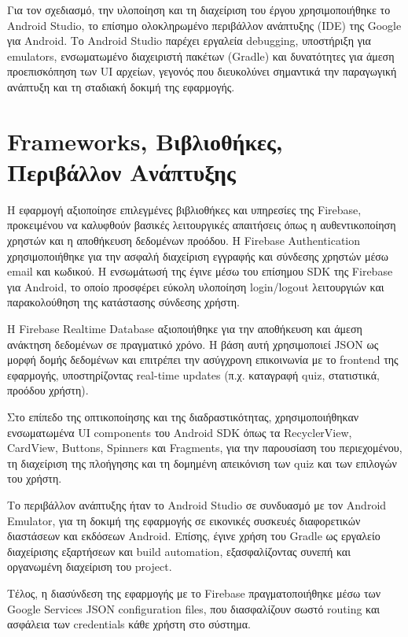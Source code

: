 \documentclass[11pt]{report}
\begin{document}
Για τον σχεδιασμό, την υλοποίηση και τη διαχείριση του έργου χρησιμοποιήθηκε το Android Studio, το επίσημο ολοκληρωμένο περιβάλλον ανάπτυξης (IDE) της Google για Android. Το Android Studio παρέχει εργαλεία debugging, υποστήριξη για emulators, ενσωματωμένο διαχειριστή πακέτων (Gradle) και δυνατότητες για άμεση προεπισκόπηση των UI αρχείων, γεγονός που διευκολύνει σημαντικά την παραγωγική ανάπτυξη και τη σταδιακή δοκιμή της εφαρμογής. 

\section{Frameworks, Βιβλιοθήκες, Περιβάλλον Ανάπτυξης}

Η εφαρμογή αξιοποίησε επιλεγμένες βιβλιοθήκες και υπηρεσίες της Firebase, προκειμένου να καλυφθούν βασικές λειτουργικές απαιτήσεις όπως η αυθεντικοποίηση χρηστών και η αποθήκευση δεδομένων προόδου. Η Firebase Authentication χρησιμοποιήθηκε για την ασφαλή διαχείριση εγγραφής και σύνδεσης χρηστών μέσω email και κωδικού. Η ενσωμάτωσή της έγινε μέσω του επίσημου SDK της Firebase για Android, το οποίο προσφέρει εύκολη υλοποίηση login/logout λειτουργιών και παρακολούθηση της κατάστασης σύνδεσης χρήστη. 

Η Firebase Realtime Database αξιοποιήθηκε για την αποθήκευση και άμεση ανάκτηση δεδομένων σε πραγματικό χρόνο. Η βάση αυτή χρησιμοποιεί JSON ως μορφή δομής δεδομένων και επιτρέπει την ασύγχρονη επικοινωνία με το frontend της εφαρμογής, υποστηρίζοντας real-time updates (π.χ. καταγραφή quiz, στατιστικά, προόδου χρήστη). 

Στο επίπεδο της οπτικοποίησης και της διαδραστικότητας, χρησιμοποιήθηκαν ενσωματωμένα UI components του Android SDK όπως τα RecyclerView, CardView, Buttons, Spinners και Fragments, για την παρουσίαση του περιεχομένου, τη διαχείριση της πλοήγησης και τη δομημένη απεικόνιση των quiz και των επιλογών του χρήστη. 

Το περιβάλλον ανάπτυξης ήταν το Android Studio σε συνδυασμό με τον Android Emulator, για τη δοκιμή της εφαρμογής σε εικονικές συσκευές διαφορετικών διαστάσεων και εκδόσεων Android. Επίσης, έγινε χρήση του Gradle ως εργαλείο διαχείρισης εξαρτήσεων και build automation, εξασφαλίζοντας συνεπή και οργανωμένη διαχείριση του project. 

Τέλος, η διασύνδεση της εφαρμογής με το Firebase πραγματοποιήθηκε μέσω των Google Services JSON configuration files, που διασφαλίζουν σωστό routing και ασφάλεια των credentials κάθε χρήστη στο σύστημα. 
\end{document}
